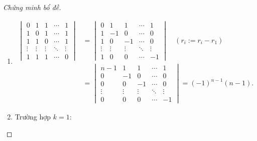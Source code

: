 \begin{proof}[Chứng minh bổ đề]
    \begin{enumerate}[label = (\roman*)]
        \item
              \begingroup{}
              \allowdisplaybreaks{}
              \begin{align*}
                  \begin{vmatrix}
                      0      & 1      & 1      & \cdots & 1      \\
                      1      & 0      & 1      & \cdots & 1      \\
                      1      & 1      & 0      & \cdots & 1      \\
                      \vdots & \vdots & \vdots & \ddots & \vdots \\
                      1      & 1      & 1      & \cdots & 0
                  \end{vmatrix}
                   & =
                  \begin{vmatrix}
                      0      & 1      & 1      & \cdots & 1      \\
                      1      & -1     & 0      & \cdots & 0      \\
                      1      & 0      & -1     & \cdots & 0      \\
                      \vdots & \vdots & \vdots & \ddots & \vdots \\
                      1      & 0      & 0      & \cdots & -1
                  \end{vmatrix}\quad(r_{i}:= r_{i} - r_{1}) \\
                   & =
                  \begin{vmatrix}
                      n-1    & 1      & 1      & \cdots & 1      \\
                      0      & -1     & 0      & \cdots & 0      \\
                      0      & 0      & -1     & \cdots & 0      \\
                      \vdots & \vdots & \vdots & \ddots & \vdots \\
                      0      & 0      & 0      & \cdots & -1
                  \end{vmatrix}
                  = {(-1)}^{n-1}(n-1).
              \end{align*}
              \endgroup{}
        \item Trường hợp $k = 1$:
              \begingroup{}

\end{enumerate}
\end{proof}
